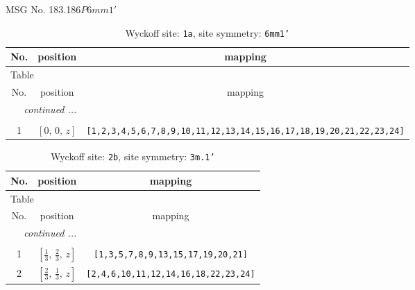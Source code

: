 \documentclass[fleqn,8pt]{jsarticle}
\begin{document}
\setcounter{MaxMatrixCols}{32}

\renewcommand{\tablename}{Table~}
\renewcommand{\figurename}{Figure~}
\begin{center}
\LARGE
MSG No. 183.186\quad$P6mm1'$
\end{center}
\renewcommand{\arraystretch}{1.2}
\begin{longtable}{ccc}
\caption{Wyckoff site: {\tt 1a}, site symmetry: {\tt 6mm1'}}
 \\
 \hline \hline
No. & position & mapping \\ \hline \endfirsthead

\multicolumn{2}{l}{\tablename\ \thetable{}} \\
 \hline \hline
No. & position & mapping \\ \hline \endhead

 \hline \hline
\multicolumn{2}{r}{\footnotesize\it continued ...} \\ \endfoot

 \hline \hline
\multicolumn{2}{r}{} \\ \endlastfoot

1 & $\left[ 0,\, 0,\, z \right]$ & {\tt [1,2,3,4,5,6,7,8,9,10,11,12,13,14,15,16,17,18,19,20,21,22,23,24]} \\
\end{longtable}
\renewcommand{\arraystretch}{1.2}
\begin{longtable}{ccc}
\caption{Wyckoff site: {\tt 2b}, site symmetry: {\tt 3m.1'}}
 \\
 \hline \hline
No. & position & mapping \\ \hline \endfirsthead

\multicolumn{2}{l}{\tablename\ \thetable{}} \\
 \hline \hline
No. & position & mapping \\ \hline \endhead

 \hline \hline
\multicolumn{2}{r}{\footnotesize\it continued ...} \\ \endfoot

 \hline \hline
\multicolumn{2}{r}{} \\ \endlastfoot

1 & $\left[ \frac{1}{3},\, \frac{2}{3},\, z \right]$ & {\tt [1,3,5,7,8,9,13,15,17,19,20,21]} \\ \hline
2 & $\left[ \frac{2}{3},\, \frac{1}{3},\, z \right]$ & {\tt [2,4,6,10,11,12,14,16,18,22,23,24]} \\
\end{longtable}
\renewcommand{\arraystretch}{1.2}
\end{document}
